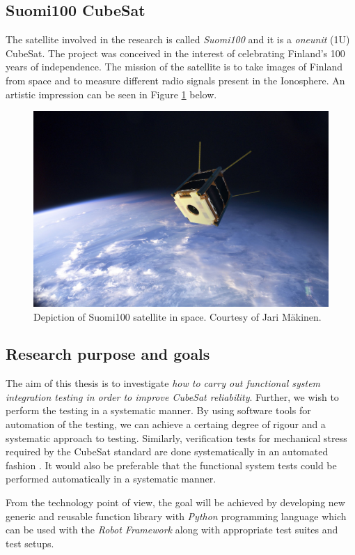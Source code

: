 \documentclass[english,12pt,a4paper,pdftex,elec,utf8]{aaltothesis}
\begin{document}
\subsection{Suomi100 CubeSat} 
The satellite involved in the research is called \textit{Suomi100} and it is a \textit{oneunit} (1U) CubeSat. The project was conceived in the interest of celebrating Finland's 100 years of independence. The mission of the satellite is to take images of Finland from space and to measure different radio signals present in the Ionosphere. An artistic impression can be seen in Figure \ref{s100intro} below.
\begin{figure}[!h]
\centering
\includegraphics[scale=0.2]{s100_orbit}
\caption{Depiction of Suomi100 satellite in space. Courtesy of Jari Mäkinen. \cite{s100blogi}}
\label{s100intro}
\end{figure} 
\subsection{Research purpose and goals}
The aim of this thesis is to investigate \textit{how to carry out
functional system integration testing in order to improve CubeSat reliability}. Further, we wish to perform the testing in a systematic manner. By using software tools for automation of the testing, we can achieve a certaing degree of rigour and a systematic approach to testing. Similarly, verification tests for mechanical stress required by the CubeSat standard are done systematically in an automated fashion \cite{cds}. It would also be preferable that the functional system tests could be performed automatically in a systematic manner.\par 
From the technology point of view, the goal will be achieved by developing new generic and reusable function library with \textit{Python} programming language which can be used with the \textit{Robot Framework} \cite{robotmain} along with appropriate test suites and test setups.\par 
\end{document}

